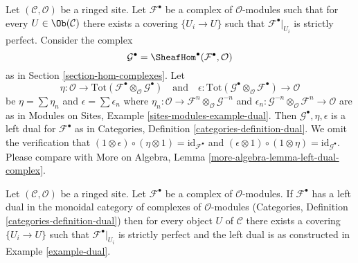 \begin{example}
\label{example-dual}
Let $(\mathcal{C}, \mathcal{O})$ be a ringed site. Let $\mathcal{F}^\bullet$
be a complex of $\mathcal{O}$-modules such that for every
$U \in \Ob(\mathcal{C})$ there exists a covering $\{U_i \to U\}$
such that $\mathcal{F}^\bullet|_{U_i}$ is strictly perfect.
Consider the complex
$$
\mathcal{G}^\bullet = \SheafHom^\bullet(\mathcal{F}^\bullet, \mathcal{O})
$$
as in Section \ref{section-hom-complexes}. Let
$$
\eta :
\mathcal{O}
\to
\text{Tot}(\mathcal{F}^\bullet \otimes_\mathcal{O} \mathcal{G}^\bullet)
\quad\text{and}\quad
\epsilon :
\text{Tot}(\mathcal{G}^\bullet \otimes_\mathcal{O} \mathcal{F}^\bullet)
\to
\mathcal{O}
$$
be $\eta = \sum \eta_n$ and $\epsilon = \sum \epsilon_n$
where $\eta_n : \mathcal{O} \to
\mathcal{F}^n \otimes_\mathcal{O} \mathcal{G}^{-n}$
and
$\epsilon_n : \mathcal{G}^{-n} \otimes_\mathcal{O} \mathcal{F}^n
\to \mathcal{O}$ are as in
Modules on Sites, Example \ref{sites-modules-example-dual}.
Then $\mathcal{G}^\bullet, \eta, \epsilon$
is a left dual for $\mathcal{F}^\bullet$ as in
Categories, Definition \ref{categories-definition-dual}.
We omit the verification that
$(1 \otimes \epsilon) \circ (\eta \otimes 1) = \text{id}_{\mathcal{F}^\bullet}$
and
$(\epsilon \otimes 1) \circ (1 \otimes \eta) =
\text{id}_{\mathcal{G}^\bullet}$. Please compare with
More on Algebra, Lemma \ref{more-algebra-lemma-left-dual-complex}.
\end{example}

\begin{lemma}
\label{lemma-left-dual-complex}
Let $(\mathcal{C}, \mathcal{O})$ be a ringed site. Let $\mathcal{F}^\bullet$
be a complex of $\mathcal{O}$-modules. If $\mathcal{F}^\bullet$
has a left dual in the monoidal category of complexes of
$\mathcal{O}$-modules
(Categories, Definition \ref{categories-definition-dual})
then for every object $U$ of $\mathcal{C}$ there exists a
covering $\{U_i \to U\}$ such that $\mathcal{F}^\bullet|_{U_i}$
is strictly perfect and the left dual is as constructed in
Example \ref{example-dual}.
\end{lemma}

